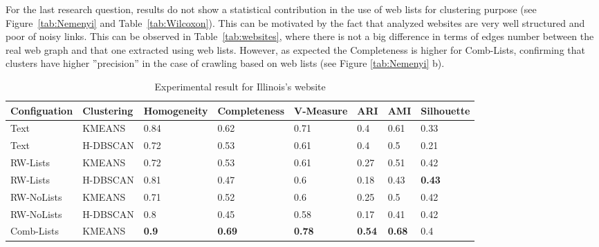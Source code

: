 For the last research question, results do not show a statistical contribution in the use of web lists for clustering purpose (see Figure~\ref{tab:Nemenyi} and Table~\ref{tab:Wilcoxon}). This can be motivated by the fact that analyzed websites are very well structured and poor of noisy links. This can be observed in Table~\ref{tab:websites}, where there is not a big difference in terms of edges number between the real web graph and that one extracted using web lists. However, as expected the Completeness is higher for Comb-Lists, confirming that clusters have higher ''precision'' in the case of crawling based on web lists (see Figure \ref{tab:Nemenyi} b).
\begin{landscape}

\begin{table}[h]
\centering
\caption{Experimental result for Illinois's website}
\label{tab:illinois}
\begin{tabular}{|l|l|l|l|l|l|l|l|}
\hline
Configuation  & Clustering & Homogeneity & Completeness & V-Measure & ARI & AMI & Silhouette \\ \hline \hline
Text &  KMEANS & 0.84 & 0.62 & 0.71 & 0.4 & 0.61 & 0.33\\ \hline
Text &  H-DBSCAN & 0.72 & 0.53 & 0.61 & 0.4 & 0.5 & 0.21\\ \hline
\hline
RW-Lists  & KMEANS & 0.72 & 0.53 & 0.61 & 0.27 & 0.51 & 0.42 \\ \hline
RW-Lists &  H-DBSCAN & 0.81 & 0.47 & 0.6 & 0.18 & 0.43 & \textbf{0.43} \\ \hline
RW-NoLists  &  KMEANS & 0.71 & 0.52 & 0.6 & 0.25 & 0.5 & 0.42 \\ \hline
RW-NoLists  &  H-DBSCAN & 0.8 & 0.45 & 0.58 & 0.17 & 0.41 & 0.42\\ \hline
\hline
Comb-Lists &  KMEANS & \textbf{0.9} & \textbf{0.69} & \textbf{0.78} & \textbf{0.54} & \textbf{0.68} & 0.4 \\ \hline

\end{tabular}
\end{table}
\end{landscape}
